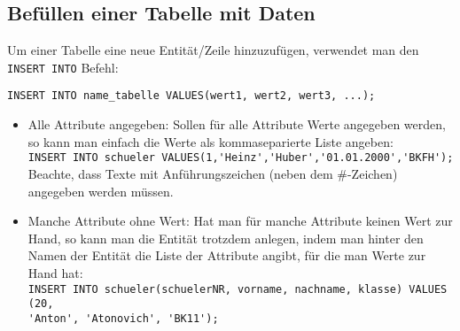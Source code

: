 \subsection{Befüllen einer Tabelle mit Daten}
Um einer Tabelle eine neue Entität/Zeile hinzuzufügen, verwendet man den \lstinline!INSERT INTO! Befehl:\\
\begin{tcolorbox}[title=Befüllen einer Tabelle]
	\lstinline!INSERT INTO name_tabelle VALUES(wert1, wert2, wert3, ...);!
\end{tcolorbox}
\begin{itemize}
	\item Alle Attribute angegeben: Sollen für alle Attribute Werte angegeben werden, so kann man einfach die Werte als kommaseparierte Liste angeben:\\
	\lstinline!INSERT INTO schueler VALUES(1,'Heinz','Huber','01.01.2000','BKFH');!\\
	Beachte, dass Texte mit Anführungszeichen (neben dem \#-Zeichen) angegeben werden müssen.
	\item Manche Attribute ohne Wert: Hat man für manche Attribute keinen Wert zur Hand, so kann man die Entität trotzdem anlegen, indem man hinter den Namen der Entität die Liste der Attribute angibt, für die man Werte zur Hand hat:\\
	\lstinline!INSERT INTO schueler(schuelerNR, vorname, nachname, klasse) VALUES (20,!\\
	\lstinline!'Anton', 'Atonovich', 'BK11');!
\end{itemize}

